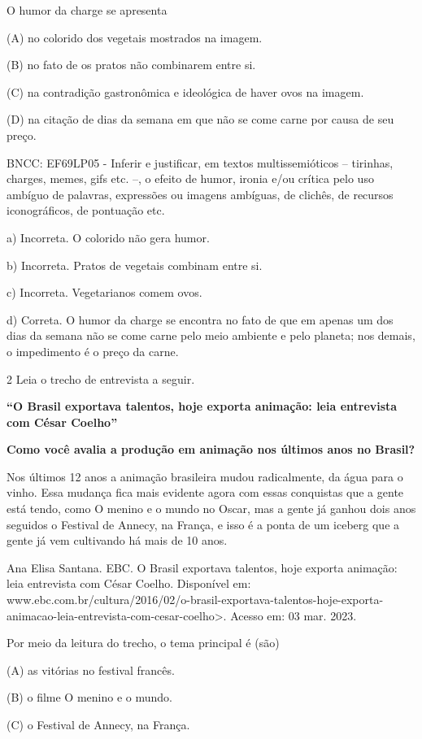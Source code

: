 \begin{itemize}
\begin{itemize}
{\begin{itemize}
\begin{itemize}
O humor da charge se apresenta

(A) no colorido dos vegetais mostrados na imagem.

(B) no fato de os pratos não combinarem entre si.

(C) na contradição gastronômica e ideológica de haver ovos na imagem.

(D) na citação de dias da semana em que não se come carne por causa de
seu preço.

BNCC: EF69LP05 - Inferir e justificar, em textos multissemióticos --
tirinhas, charges, memes, gifs etc. --, o efeito de humor, ironia e/ou
crítica pelo uso ambíguo de palavras, expressões ou imagens ambíguas, de
clichês, de recursos iconográficos, de pontuação etc.

a) Incorreta. O colorido não gera humor.

b) Incorreta. Pratos de vegetais combinam entre si.

c) Incorreta. Vegetarianos comem ovos.

d) Correta. O humor da charge se encontra no fato de que em apenas um
dos dias da semana não se come carne pelo meio ambiente e pelo planeta;
nos demais, o impedimento é o preço da carne.

\num{2} Leia o trecho de entrevista a seguir.

\textbf{``O Brasil exportava talentos, hoje exporta animação: leia
entrevista com César Coelho''}

\textbf{Como você avalia a produção em animação nos últimos anos no
Brasil?}

Nos últimos 12 anos a animação brasileira mudou radicalmente, da água
para o vinho. Essa mudança fica mais evidente agora com essas conquistas
que a gente está tendo, como O menino e o mundo no Oscar, mas a gente já
ganhou dois anos seguidos o Festival de Annecy, na França, e isso é a
ponta de um iceberg que a gente já vem cultivando há mais de 10 anos.

Ana Elisa Santana. EBC. O Brasil exportava talentos, hoje exporta
animação: leia entrevista com César Coelho. Disponível em:
www.ebc.com.br/cultura/2016/02/o-brasil-exportava-talentos-hoje-exporta-animacao-leia-entrevista-com-cesar-coelho\textgreater{}.
Acesso em: 03 mar. 2023.

Por meio da leitura do trecho, o tema principal é (são)

(A) as vitórias no festival francês.

(B) o filme O menino e o mundo.

(C) o Festival de Annecy, na França.


\end{itemize}
\end{itemize}}
\end{itemize}
\end{itemize}
